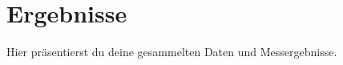 
\chapter{Ergebnisse}
\label{chap:ergebnisse}

Hier präsentierst du deine gesammelten Daten und Messergebnisse.